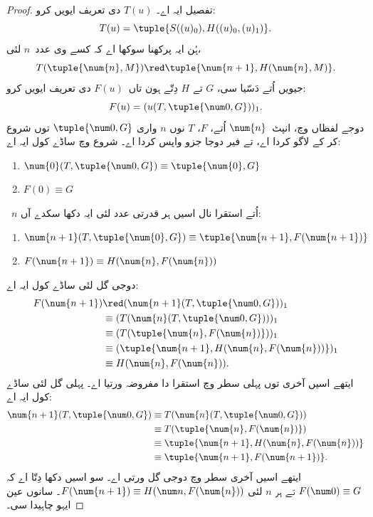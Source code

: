 \documentclass[../../../include/open-logic-section]{subfiles}
\begin{document}
\begin{proof}
تفصیل ایہ اے۔ $T(u)$ دی تعریف ایویں کرو:
\[
T(u) = \tuple{S((u)_0), H((u)_0,(u)_1)}.
\]
ہُن ایہ پرکھنا سوکھا اے کہ کسے وی عدد~$n$ لئی،
\[
T(\tuple{\num{n}, M}) \red \tuple{\num{n+1}, H(\num{n}, M)}.
\]
جیویں اُتے دَسّیا سی، $G$ تے $H$ دِتّے ہون تاں~$F(u)$ دی تعریف
ایویں کرو:
\[
F(u) = (u(T,\tuple{\num 0, G}))_1.
\]
دوجے لفظاں وچ، انپٹ~$\num{n}$ اُتے، $F$، $T$ نوں $n$ واری
$\tuple{\num 0, G}$ توں شروع کر کے لاگو کردا اے، تے فیر دوجا جزو
واپس کردا اے۔ شروع وچ ساڈے کول ایہ اے:
\begin{enumerate}
\item $\num{0} (T, \tuple{\num 0, G}) \equiv \tuple{\num{0}, G}$
\item $F(\num{0}) \equiv G$
\end{enumerate}
~$n$ اُتے استقرا نال اسیں ہر قدرتی عدد لئی ایہ دکھا سکدے آں:
\begin{enumerate}
\item $\num{n+1}(T, \tuple{\num{0}, G}) \equiv \tuple{\num{n+1}, F(\num{n+1})}$
\item $F(\num{n+1}) \equiv H(\num{n}, F(\num{n}))$
\end{enumerate}
دوجی گل لئی ساڈے کول ایہ اے:
\begin{align*}
F(\num{n+1}) & \red (\num{n+1}(T, \tuple{\num 0, G}))_1 \\
& \equiv (T(\num{n} (T, \tuple{\num 0, G})))_1 \\
& \equiv (T(\tuple{\num{n}, F(\num{n})}))_1 \\
& \equiv (\tuple{\num{n+1}, H(\num{n}, F(\num{n}))})_1 \\
& \equiv H(\num{n}, F(\num{n})).
\end{align*}
ایتھے اسیں آخری توں پہلی سطر وچ استقرا دا مفروضہ ورتیا اے۔ پہلی
گل لئی ساڈے کول ایہ اے:
\begin{align*}
\num{n+1} (T, \tuple{\num 0, G}) &
\equiv T(\num{n} (T, \tuple{\num 0, G})) \\
& \equiv T( \tuple{\num{n}, F(\num{n})}) \\
& \equiv \tuple{\num{n+1}, H(\num{n}, F(\num{n}))} \\
& \equiv \tuple{\num{n+1}, F(\num{n+1})}.
\end{align*}
ایتھے اسیں آخری سطر وچ دوجی گل ورتی اے۔ سو اسیں دکھا دِتّا اے کہ
$F(\num 0) \equiv G$ تے ہر $n$ لئی $F(\num {n+1}) \equiv H(\num
n, F(\num{n}))$۔ سانوں عین ایہو چاہیدا سی۔
\end{proof}
\end{document}
